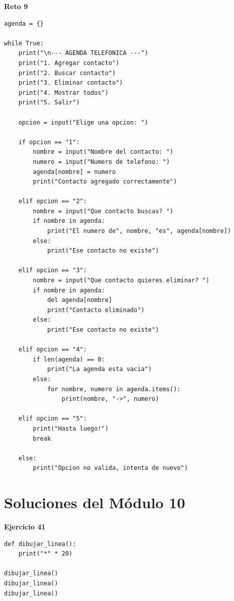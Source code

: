 \documentclass[12pt,a4paper]{article}
\begin{document}
\begin{cajaSolucion}
\textbf{Reto 9}
\begin{lstlisting}[style=pythonStyle]
agenda = {}

while True:
    print("\n--- AGENDA TELEFONICA ---")
    print("1. Agregar contacto")
    print("2. Buscar contacto")
    print("3. Eliminar contacto")
    print("4. Mostrar todos")
    print("5. Salir")

    opcion = input("Elige una opcion: ")

    if opcion == "1":
        nombre = input("Nombre del contacto: ")
        numero = input("Numero de telefono: ")
        agenda[nombre] = numero
        print("Contacto agregado correctamente")

    elif opcion == "2":
        nombre = input("Que contacto buscas? ")
        if nombre in agenda:
            print("El numero de", nombre, "es", agenda[nombre])
        else:
            print("Ese contacto no existe")

    elif opcion == "3":
        nombre = input("Que contacto quieres eliminar? ")
        if nombre in agenda:
            del agenda[nombre]
            print("Contacto eliminado")
        else:
            print("Ese contacto no existe")

    elif opcion == "4":
        if len(agenda) == 0:
            print("La agenda esta vacia")
        else:
            for nombre, numero in agenda.items():
                print(nombre, "->", numero)

    elif opcion == "5":
        print("Hasta luego!")
        break

    else:
        print("Opcion no valida, intenta de nuevo")
\end{lstlisting}
\end{cajaSolucion}

\section{Soluciones del Módulo 10}

\begin{cajaSolucion}
\textbf{Ejercicio 41}
\begin{lstlisting}[style=pythonStyle]
def dibujar_linea():
    print("*" * 20)

dibujar_linea()
dibujar_linea()
dibujar_linea()
\end{lstlisting}
\end{cajaSolucion}
\end{document}

